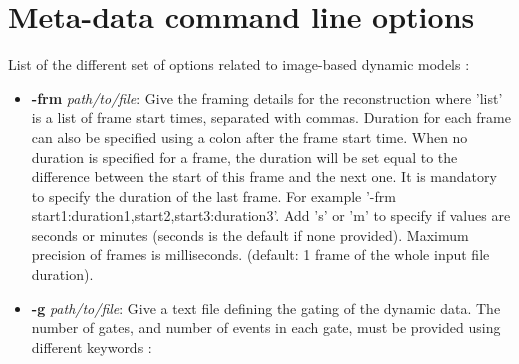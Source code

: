 \documentclass[a4paper, 11pt]{article}
\begin{document}
\section{Meta-data command line options}
\label{section_Meta-data command line options}
List of the different set of options related to image-based dynamic models :
\begin{itemize}
\item \textbf{-frm} \textit{path/to/file}: Give the framing details for the reconstruction where 'list' is a list of frame start times, separated with commas. Duration for each frame can also be specified using a colon after the frame start time. When no duration is specified for a frame, the duration will be set equal to the difference between the start of this frame and the next one. It is mandatory to specify the duration of the last frame. For example '-frm start1:duration1,start2,start3:duration3'. Add 's' or 'm' to specify if values are seconds or minutes (seconds is the default if none provided). Maximum precision of frames is milliseconds. (default: 1 frame of the whole input file duration).           
\item \textbf{-g} \textit{path/to/file}: Give a text file defining the gating of the dynamic data. The number of gates, and number of events in each gate, must be provided using different keywords :

\end{itemize}
\end{document}

